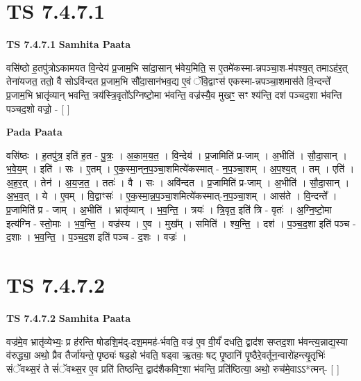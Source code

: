 \documentclass[17pt]{extarticle}
\begin{document}
\section*{ TS 7.4.7.1 }

\textbf{TS 7.4.7.1 } \newline
\textbf{Samhita Paata} \newline

वसि॑ष्ठो ह॒तपु॑त्रोऽकामयत वि॒न्देय॑ प्र॒जाम॒भि सा॑दा॒सान् भ॑वेय॒मिति॒ स ए॒तमे॑कस्मा-न्नपञ्चा॒श-म॑पश्य॒त् तमाऽह॑र॒त् तेना॑यजत॒ ततो॒ वै सोऽवि॑न्दत प्र॒जाम॒भि सौ॑दा॒सान॑भव॒द्य ए॒वं ॅवि॒द्वाꣳस॑ एकस्मा-न्नपञ्चा॒शमास॑ते वि॒न्दन्ते᳚ प्र॒जाम॒भि भ्रातृ॑व्यान् भवन्ति॒ त्रय॑स्त्रि॒वृतो᳚ऽग्निष्टो॒मा भ॑वन्ति॒ वज्र॑स्यै॒व मुखꣳ॒॒ सꣳ श्य॑न्ति॒ दश॑ पञ्चद॒शा भ॑वन्ति पञ्चद॒शो वज्रो॒ - [  ] \newline

\textbf{Pada Paata} \newline

वसि॑ष्ठः । ह॒तपु॑त्र॒ इति॑ ह॒त - पु॒त्रः॒ । अ॒का॒म॒य॒त॒ । वि॒न्देय॑ । प्र॒जामिति॑ प्र-जाम् । अ॒भीति॑ । सौ॒दा॒सान् । भ॒वे॒य॒म् । इति॑ । सः । ए॒तम् । ए॒क॒स्मा॒न्‌न॒प॒ञ्चा॒शमित्ये॑कस्मात् - न॒प॒ञ्चा॒शम् । अ॒प॒श्य॒त् । तम् । एति॑ । अ॒ह॒र॒त् । तेन॑ । अ॒य॒ज॒त॒ । ततः॑ । वै । सः । अवि॑न्दत । प्र॒जामिति॑ प्र-जाम् । अ॒भीति॑ । सौ॒दा॒सान् । अ॒भ॒व॒त् । ये । ए॒वम् । वि॒द्वाꣳसः॑ । ए॒क॒स्मा॒न्न॒प॒ञ्चा॒शमित्ये॑कस्मात्-न॒प॒ञ्चा॒शम् । आस॑ते । वि॒न्दन्ते᳚ । प्र॒जामिति॑ प्र - जाम् । अ॒भीति॑ । भ्रातृ॑व्यान् । भ॒व॒न्ति॒ । त्रयः॑ । त्रि॒वृत॒ इति॑ त्रि - वृतः॑ । अ॒ग्नि॒ष्टो॒मा इत्य॑ग्नि - स्तो॒माः । भ॒व॒न्ति॒ । वज्र॑स्य । ए॒व । मुख᳚म् । समिति॑ । श्य॒न्ति॒ । दश॑ । प॒ञ्च॒द॒शा इति॑ पञ्च - द॒शाः । भ॒व॒न्ति॒ । प॒ञ्च॒द॒श इति॑ पञ्च - द॒शः । वज्रः॑ ।  \newline




\section*{ TS 7.4.7.2 }

\textbf{TS 7.4.7.2 } \newline
\textbf{Samhita Paata} \newline

वज्र॑मे॒व भ्रातृ॑व्येभ्यः॒ प्र ह॑रन्ति षोडशि॒म॑द्-दश॒ममह॑-र्भवति॒ वज्र॑ ए॒व वी॒र्यं॑ दधति॒ द्वाद॑श सप्तद॒शा भ॑वन्त्य॒न्नाद्य॒स्या व॑रुद्ध्या॒ अथो॒ प्रैव तैर्जा॑यन्ते॒ पृष्ठ्यः॑ षड॒हो भ॑वति॒ षड्वा ऋ॒तवः॒ षट् पृ॒ष्ठानि॑ पृ॒ष्ठैरे॒वर्तून॒न्वारो॑हन्त्यृ॒तृभिः॑ संॅवथ्स॒रं ते सं॑ॅवथ्स॒र ए॒व प्रति॑ तिष्ठन्ति॒ द्वाद॑शैकविꣳ॒॒शा भ॑वन्ति॒ प्रति॑ष्ठित्या॒ अथो॒ रुच॑मे॒वाऽऽ*त्मन्- [  ] \newline
\end{document}
